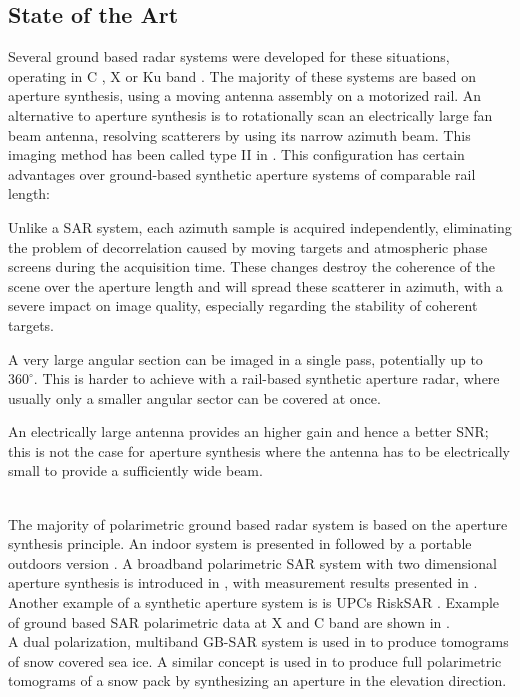 \subsection{State of the Art}
Several ground based radar systems were developed for these situations, operating in C \cite{Leva2003, Rudolf1999a,Kang2009}, X \cite{Aguasca2004,Pipia2007a} or Ku band \cite{Leva2003, Rudolf1999a,Werner2008, Rodelsperger2012}. The majority of these systems are based on aperture synthesis, using a moving antenna assembly on a motorized rail. 
An alternative to aperture synthesis is to rotationally scan an electrically large fan beam antenna, resolving  scatterers by using its narrow azimuth beam\cite{Werner2008,werner_gpri_2012}. This imaging method has been called type II in \cite{Caduff2015}. 
This configuration has certain advantages over ground-based synthetic aperture systems\cite{Monserrat2014} of comparable rail length: \begin{enumerate*}
  \item Unlike a SAR system, each azimuth sample is 
acquired independently, eliminating the problem of decorrelation caused by moving targets and atmospheric phase screens during the acquisition time. 
These changes destroy the coherence of the scene over the aperture length and will spread these scatterer in azimuth, with a severe impact on image quality, especially regarding the stability of coherent targets.\\
 \item A very large 
angular section can be imaged in a single pass, potentially up to $360^{\circ}$. This is harder to achieve with a rail-based synthetic aperture radar, where usually only a smaller angular sector
can be covered at once.\\
\item An electrically large antenna provides an higher gain and hence a better SNR; this is not the case for  aperture synthesis  where the antenna has to be electrically small to provide a sufficiently wide beam.\\
\end{enumerate*}\\
The majority of polarimetric ground based radar system is based on the aperture synthesis principle. An indoor system is presented in \cite{Bennett1996} followed by a portable outdoors version \cite{Bennett2000}. A broadband polarimetric SAR system with two dimensional aperture synthesis is introduced in \cite{Zhou2004}, with measurement results presented in \cite{Hamasaki2005}.
Another example  of a synthetic aperture system is is UPCs RiskSAR \cite{Iglesias2014, Aguasca2004,Pipia2007a,Pipia2009, Pipia2013,Iglesias2014}. Example of ground based SAR polarimetric data at X and C band are shown in \cite{Kang2009, Kang2010}.\\ A dual polarization, multiband GB-SAR system is used in \cite{Yitayew2014} to produce tomograms of snow covered sea ice. A similar concept is used in\cite{Frey2015,Frey2016} to produce full polarimetric tomograms of a snow pack by synthesizing an aperture in the elevation direction.\\

